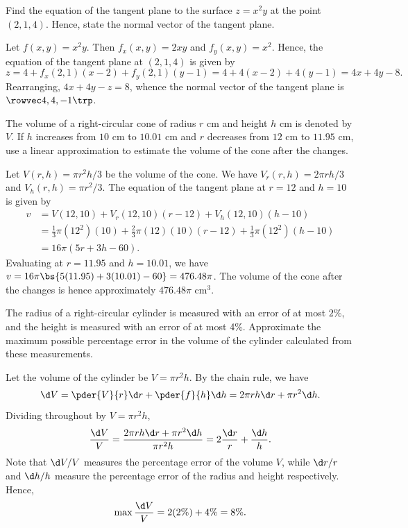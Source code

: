 \begin{problem}
    Find the equation of the tangent plane to the surface $z = x^2 y$ at the point $(2, 1, 4)$. Hence, state the normal vector of the tangent plane.
\end{problem}
\begin{solution}
    Let $f(x, y) = x^2y$. Then $f_x(x, y) = 2xy$ and $f_y(x, y) = x^2$. Hence, the equation of the tangent plane at $(2, 1, 4)$ is given by \[z = 4 + f_x(2, 1)(x-2) + f_y(2, 1)(y - 1) = 4 + 4(x-2) + 4(y-1) = 4x + 4y - 8.\] Rearranging, $4x + 4y - z = 8$, whence the normal vector of the tangent plane is $\cveciiix44{-1}$.
\end{solution}

\begin{problem}
    The volume of a right-circular cone of radius $r$ cm and height $h$ cm is denoted by $V$. If $h$ increases from $10$ cm to $10.01$ cm and $r$ decreases from $12$ cm to $11.95$ cm, use a linear approximation to estimate the volume of the cone after the changes.
\end{problem}
\begin{solution}
    Let $V(r, h) = \pi r^2 h/3$ be the volume of the cone. We have $V_r(r, h) = 2\pi r h/3$ and $V_h(r, h) = \pi r^2/3$. The equation of the tangent plane at $r = 12$ and $h = 10$ is given by
    \begin{align*}
        v &= V(12, 10) + V_r(12, 10)(r-12) + V_h(12, 10)(h-10)\\
        &= \frac13\pi(12^2)(10) + \frac23 \pi(12)(10)(r - 12) + \frac13 \pi (12^2) (h-10)\\
        &= 16\pi(5r + 3h - 60).
    \end{align*}
    Evaluating at $r = 11.95$ and $h = 10.01$, we have $v = 16\pi\bs{5(11.95) + 3(10.01) - 60} = 476.48\pi$. The volume of the cone after the changes is hence approximately $476.48\pi$ cm$^3$.
\end{solution}

\begin{problem}
    The radius of a right-circular cylinder is measured with an error of at most $2\%$, and the height is measured with an error of at most 4\%. Approximate the maximum possible percentage error in the volume of the cylinder calculated from these measurements.
\end{problem}
\begin{solution}
    Let the volume of the cylinder be $V = \pi r^2 h$. By the chain rule, we have \[\d V = \pder{V}{r} \d r + \pder{f}{h} \d h = 2\pi rh \d  r + \pi r^2 \d h.\] Dividing throughout by $V = \pi r^2 h$, \[\frac{\d V}{V} = \frac{2\pi rh \d  r + \pi r^2 \d h}{\pi r^2 h} = 2 \frac{\d r}{r} + \frac{\d h}{h}.\] Note that $\d V / V$ measures the percentage error of the volume $V$, while $\d r / r$ and $\d h / h$ measure the percentage error of the radius and height respectively. Hence, \[\max \frac{\d V}{V} = 2(2\%) + 4\% = 8\%.\]
\end{solution}

